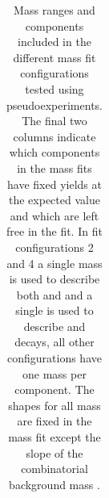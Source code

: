 {\begin{table}[h!]
\begin{center}
\begin{tabular}{lclcc}
\end{tabular}
\vspace{0.7cm}
\caption{Mass ranges and components included in the different mass fit configurations tested using pseudoexperiments. The final two columns indicate which components in the mass fits have fixed yields at the expected value and which are left free in the fit. In fit configurations 2 and 4 a single mass \pdf is used to describe both \bdpimunu and \bsKmunu and a single \pdf is used to describe \bupimumu and \bdpimumu decays, all other configurations have one mass \pdf per component. The shapes for all mass \pdfs are fixed in the mass fit except the slope of the combinatorial background mass \pdf.}                                                                                                  
\label{tab:toyconfig}
\end{center}
\end{table}



}
